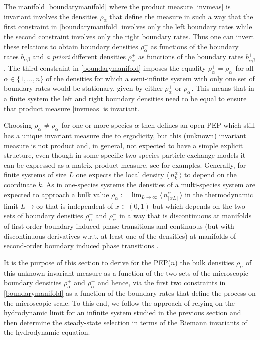 \documentclass[12pt]{article}
\newcommand{\exval}[1]{\mbox{$\langle \, {#1}\, \rangle$}}
\begin{document}
The manifold \eqref{boundarymanifold} where the product measure \eqref{invmeas} is invariant involves the densities $\rho_\alpha$ that
define the measure in such a way that the first constraint in 
\eqref{boundarymanifold} involves only the left boundary rates
while the second constraint involves only the right boundary rates.
Thus one can invert these relations to obtain boundary densities $\rho_\alpha^{-}$
as functions of the boundary rates $b^{-}_{\alpha\beta}$ and 
{\it a priori} different densities $\rho_\alpha^{+}$
as functions of the boundary rates $b^{+}_{\alpha\beta}$.
The third constraint in \eqref{boundarymanifold} imposes the equality $\rho_\alpha^{+}=\rho_\alpha^{-}$ for all $\alpha\in\{1,\dots,n\}$ of the
densities for which a semi-infinite system with only one set of boundary rates would be stationary, given by either $\rho_\alpha^{+}$ or $\rho_\alpha^{-}$.
This means that in a finite system the left and right boundary densities
need to be equal to ensure that product measure \eqref{invmeas} is 
invariant.

Choosing $\rho_\alpha^{+}\neq \rho_\alpha^{-}$ for one or more
species $\alpha$ then defines an open PEP which still has a unique
invariant measure due to ergodicity, but this (unknown) invariant measure 
is not product and, in general, not expected to have a simple explicit structure, even though in some specific two-species particle-exchange models it can be expressed as a matrix product measure, see \cite{Alca98,Isae01,Arit06,Uchi08,Ayye09,Ayye12,Cram15,Cram16a}
for examples. Generally, for finite systems of size $L$ one expects the local density $\exval{n^\alpha_{k}}$ to depend on the coordinate $k$. As in one-species systems \cite{Derr93a,Schu93b,Popk99}
the densities of a multi-species system are expected to approach a bulk value
$\rho_\alpha
:= \lim_{L\to\infty} \exval{n^\alpha_{
\lfloor
x L\rfloor}}$ in the thermodynamic limit $L\to\infty$ that is independent of $x\in(0,1)$ but which depends on
the two sets of boundary densities
$\rho_\alpha^{+}$ and $\rho_\alpha^{-}$ in a way that is discontinuous
at manifolds of first-order boundary induced phase transitions and
continuous (but with discontinuous derivatives w.r.t. at least one of the densities) at manifolds of second-order boundary induced phase transitions
\cite{Popk04a,Popk11,Cant24}.

It is the purpose of this section to derive for the PEP($n$)
the bulk densities $\rho_\alpha$
of this unknown invariant measure as a function of the two sets of 
the microscopic boundary densities
$\rho_\alpha^{+}$ and $\rho_\alpha^{-}$ and hence, via the first two
constraints in
\eqref{boundarymanifold} as a function of the
boundary rates that define the process on the microscopic scale. To this end, we follow
the approach of \cite{Cant24,zahra2025hydrodynamics} relying on the hydrodynamic limit
for an infinite system studied in the previous section and then determine the steady-state selection
in terms of the Riemann invariants of the hydrodynamic equation.
\end{document}
